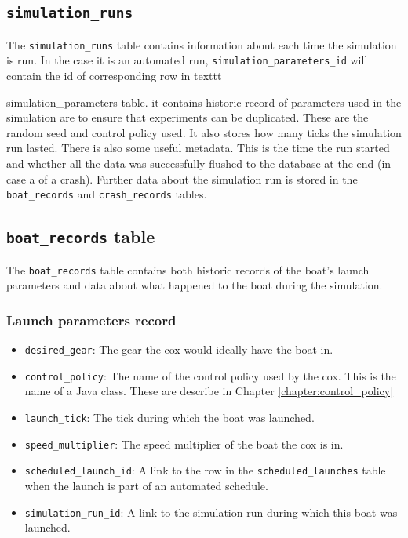 \subsection{\texttt{simulation\_runs}}
The \texttt{simulation\_runs} table contains information about each
time the simulation is run. In the case it is an automated run,
\texttt{simulation\_parameters\_id} will contain the id of corresponding row in
texttt{simulation\_parameters table. it contains historic record of parameters
  used in the simulation are to ensure that experiments can be
  duplicated. These are the random seed and control policy used. It
  also stores how many ticks the simulation run lasted. There is also
  some useful metadata. This is the time the run started and whether
  all the data was successfully flushed to the database at the end (in
  case a of a crash). Further data about the simulation run is stored
  in the \texttt{boat\_records} and \texttt{crash\_records} tables.

\subsection{\texttt{boat\_records} table}
The \texttt{boat\_records} table contains both historic records of the
boat's launch parameters and data about what happened to the boat
during the simulation.

\subsubsection{Launch parameters record}

\begin{itemize}
  \item{\texttt{desired\_gear}:} The gear the cox would ideally have the boat
    in.
  \item{\texttt{control\_policy}:} The name of the control policy used by the
    cox. This is the name of a Java class. These are describe in Chapter \ref{chapter:control_policy}
  \item{\texttt{launch\_tick}:} The tick during which the boat was launched.
  \item{\texttt{speed\_multiplier}:} The speed multiplier of the boat the cox
    is in.
  \item{\texttt{scheduled\_launch\_id}:} A link to the row in the
    \texttt{scheduled\_launches} table when the launch is part of an
    automated schedule.
  \item{\texttt{simulation\_run\_id}:} A link to the simulation run during
    which this boat was launched.
\end{itemize}

}

